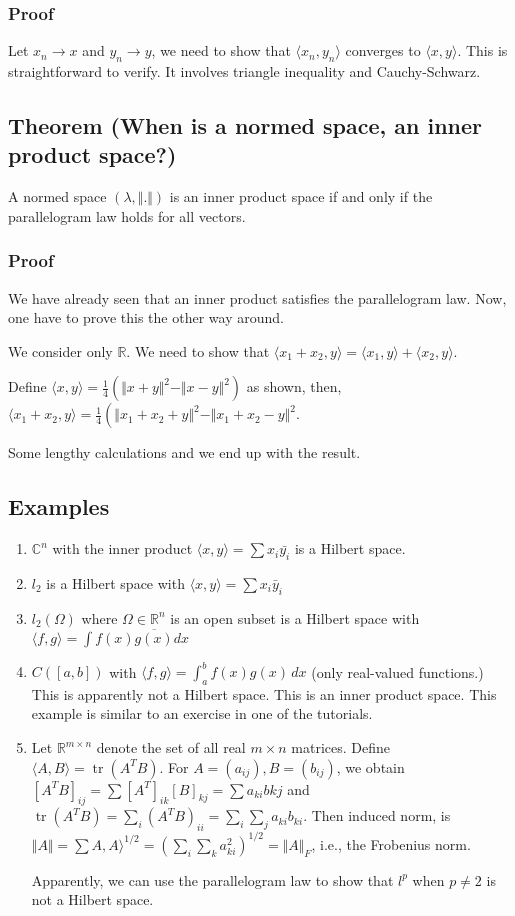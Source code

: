 \documentclass[11pt]{article}
\def\R{\mathbb{R}}
\def\C{\mathbb{C}}
\def\tr{\operatorname{tr}}
\begin{document}
\subsubsection{Proof}
\label{sec:org50c83dd}
Let \(x_n \rightarrow x\) and \(y_n \rightarrow y\), we need to show that
\(\langle x_n, y_n \rangle\) converges to \(\langle x, y \rangle\). This is
straightforward to verify. It involves triangle inequality and
Cauchy-Schwarz.
\subsection{Theorem (When is a normed space, an inner product space?)}
\label{sec:org1248861}
A normed space \((\lambda, \Vert . \Vert)\) is an inner product space if and
only if the parallelogram law holds for all vectors.
\subsubsection{Proof}
\label{sec:orgd652f33}
We have already seen that an inner product satisfies the parallelogram law.
Now, one have to prove this the other way around.

We consider only \(\R\). We need to show that \(\langle x_1 + x_2, y \rangle =
    \langle x_1, y \rangle + \langle x_2, y \rangle\).

Define \(\langle x, y \rangle = \frac{1}{4}(\Vert x + y \Vert^2 - \Vert x-
    y\Vert^2)\) as shown, then, \(\langle x_1 + x_2, y \rangle =
    \frac{1}{4}\left(\Vert x_1 + x_2 + y \Vert^2 - \Vert x_1 +x_2 - y \Vert^2\).

Some lengthy calculations and we end up with the result.
\subsection{Examples}
\label{sec:org7452ea5}
\begin{enumerate}
\item \(\C^n\) with the inner product \(\langle x, y \rangle = \sum x_i \bar{y_i}\)
is a Hilbert space.
\item \(l_2\) is a Hilbert space with \(\langle x, y \rangle = \sum x_i \bar{y}_i\)
\item \(l_2(\Omega)\) where \(\Omega \in \R^n\) is an open subset is a Hilbert space
with \(\langle f, g \rangle = \int f(x)\overline{g(x)} dx\)
\item \(C([a, b])\) with \(\langle f, g \rangle = \int_{a}^{b} f(x)g(x)\, dx\) (only
real-valued functions.) This is apparently not a Hilbert space. This is an
inner product space. This example is similar to an exercise in one of the
tutorials.
\item Let \(\R^{m\times n}\) denote the set of all real \(m\times n\) matrices.
Define \(\langle A, B\rangle = \tr(A^TB)\). For \(A = (a_{ij}), B= (b_{ij})\),
we obtain \([A^TB]_{ij} = \sum [A^T]_{ik} [B]_{kj} = \sum a_{ki}b{kj}\) and
\(\tr(A^TB) = \sum_{i}(A^TB)_{ii} = \sum_i\sum_j a_{ki}b_{ki}\). Then
induced norm, is \(\Vert A \Vert = \sum A, A\rangle^{1/2} = \left(\sum_i
      \sum_k a_{ki}^2\right)^{1/2} = \Vert A \Vert_F\), i.e., the Frobenius norm.

Apparently, we can use the parallelogram law to show that \(l^p\) when
\(p\neq 2\) is not a Hilbert space.
\end{enumerate}
\end{document}
